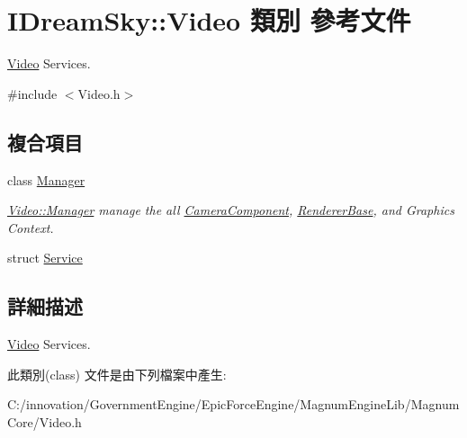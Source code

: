 \hypertarget{class_i_dream_sky_1_1_video}{}\section{I\+Dream\+Sky\+:\+:Video 類別 參考文件}
\label{class_i_dream_sky_1_1_video}


\hyperlink{class_i_dream_sky_1_1_video}{Video} Services.  




{\ttfamily \#include $<$Video.\+h$>$}

\subsection*{複合項目}
\begin{DoxyCompactItemize}
\item 
class \hyperlink{class_i_dream_sky_1_1_video_1_1_manager}{Manager}
\begin{DoxyCompactList}\small\item\em \hyperlink{class_i_dream_sky_1_1_video_1_1_manager}{Video\+::\+Manager} manage the all \hyperlink{class_i_dream_sky_1_1_camera_component}{Camera\+Component}, \hyperlink{class_i_dream_sky_1_1_renderer_base}{Renderer\+Base}, and Graphics Context. \end{DoxyCompactList}\item 
struct \hyperlink{struct_i_dream_sky_1_1_video_1_1_service}{Service}
\end{DoxyCompactItemize}


\subsection{詳細描述}
\hyperlink{class_i_dream_sky_1_1_video}{Video} Services. 

此類別(class) 文件是由下列檔案中產生\+:\begin{DoxyCompactItemize}
\item 
C\+:/innovation/\+Government\+Engine/\+Epic\+Force\+Engine/\+Magnum\+Engine\+Lib/\+Magnum\+Core/Video.\+h\end{DoxyCompactItemize}
